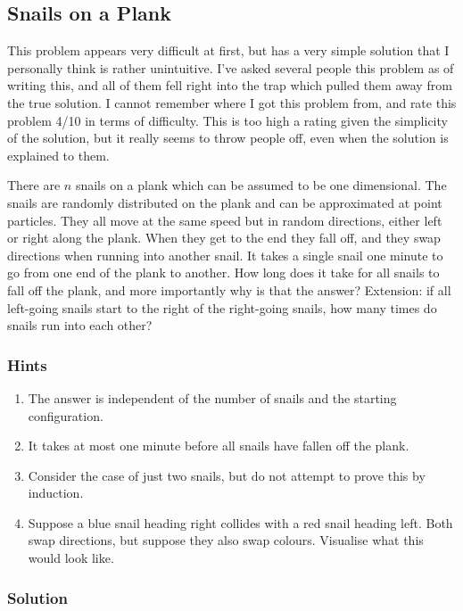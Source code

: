 \subsection{Snails on a Plank}

This problem appears very difficult at first, but has a very simple solution that I personally think is rather unintuitive. I've asked several people this problem as of writing this, and all of them fell right into the trap which pulled them away from the true solution. I cannot remember where I got this problem from, and rate this problem 4/10 in terms of difficulty. This is too high a rating given the simplicity of the solution, but it really seems to throw people off, even when the solution is explained to them.

There are $n$ snails on a plank which can be assumed to be one dimensional. The snails are randomly distributed on the plank and can be approximated at point particles. They all move at the same speed but in random directions, either left or right along the plank. When they get to the end they fall off, and they swap directions when running into another snail. It takes a single snail one minute to go from one end of the plank to another. How long does it take for all snails to fall off the plank, and more importantly why is that the answer? Extension: if all left-going snails start to the right of the right-going snails, how many times do snails run into each other?

\subsubsection{Hints}

\begin{enumerate}
	\item The answer is independent of the number of snails and the starting configuration.
	\item It takes at most one minute before all snails have fallen off the plank.
	\item Consider the case of just two snails, but do not attempt to prove this by induction.
	\item Suppose a blue snail heading right collides with a red snail heading left. Both swap directions, but suppose they also swap colours. Visualise what this would look like.
\end{enumerate}

\subsubsection{Solution}

